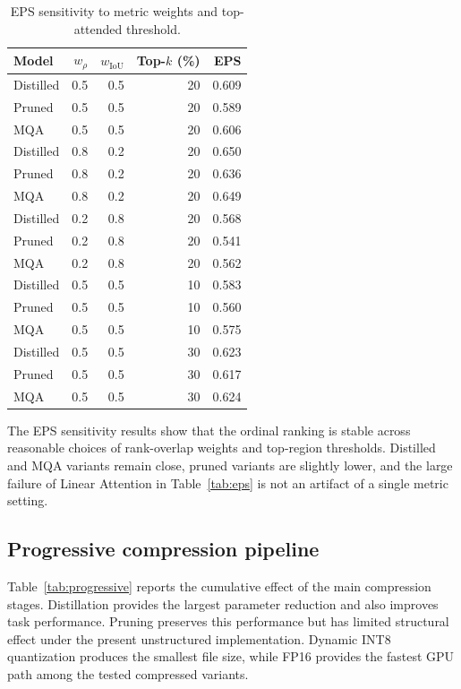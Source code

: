\documentclass[pdflatex,sn-basic,Numbered]{sn-jnl}
\begin{document}
\begin{table}[t]
\caption{EPS sensitivity to metric weights and top-attended threshold.}\label{tab:eps-sensitivity}
\centering
\scriptsize
\setlength{\tabcolsep}{5pt}
\begin{tabular}{lrrrr}
\toprule
Model & $w_{\rho}$ & $w_{\mathrm{IoU}}$ & Top-$k$ (\%) & EPS \\
\midrule
Distilled & 0.5 & 0.5 & 20 & 0.609 \\
Pruned & 0.5 & 0.5 & 20 & 0.589 \\
MQA & 0.5 & 0.5 & 20 & 0.606 \\
Distilled & 0.8 & 0.2 & 20 & 0.650 \\
Pruned & 0.8 & 0.2 & 20 & 0.636 \\
MQA & 0.8 & 0.2 & 20 & 0.649 \\
Distilled & 0.2 & 0.8 & 20 & 0.568 \\
Pruned & 0.2 & 0.8 & 20 & 0.541 \\
MQA & 0.2 & 0.8 & 20 & 0.562 \\
Distilled & 0.5 & 0.5 & 10 & 0.583 \\
Pruned & 0.5 & 0.5 & 10 & 0.560 \\
MQA & 0.5 & 0.5 & 10 & 0.575 \\
Distilled & 0.5 & 0.5 & 30 & 0.623 \\
Pruned & 0.5 & 0.5 & 30 & 0.617 \\
MQA & 0.5 & 0.5 & 30 & 0.624 \\
\bottomrule
\end{tabular}
\end{table}

The EPS sensitivity results show that the ordinal ranking is stable across reasonable choices of rank-overlap weights and top-region thresholds. Distilled and MQA variants remain close, pruned variants are slightly lower, and the large failure of Linear Attention in Table~\ref{tab:eps} is not an artifact of a single metric setting.

\subsection{Progressive compression pipeline}\label{subsec:progressive}

Table~\ref{tab:progressive} reports the cumulative effect of the main compression stages. Distillation provides the largest parameter reduction and also improves task performance. Pruning preserves this performance but has limited structural effect under the present unstructured implementation. Dynamic INT8 quantization produces the smallest file size, while FP16 provides the fastest GPU path among the tested compressed variants.
\end{document}
